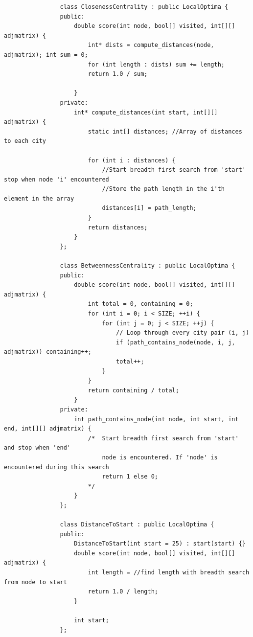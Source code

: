 \documentclass[12pt]{report}
\begin{document}
            \begin{verbatim}
                class ClosenessCentrality : public LocalOptima {
                public:
                    double score(int node, bool[] visited, int[][] adjmatrix) {
                        int* dists = compute_distances(node, adjmatrix); int sum = 0;
                        for (int length : dists) sum += length;
                        return 1.0 / sum;

                    }
                private:
                    int* compute_distances(int start, int[][] adjmatrix) {
                        static int[] distances; //Array of distances to each city

                        for (int i : distances) {
                            //Start breadth first search from 'start' stop when node 'i' encountered
                            //Store the path length in the i'th element in the array
                            distances[i] = path_length;
                        }
                        return distances;
                    }
                };

                class BetweennessCentrality : public LocalOptima {
                public:
                    double score(int node, bool[] visited, int[][] adjmatrix) {
                        int total = 0, containing = 0;
                        for (int i = 0; i < SIZE; ++i) {
                            for (int j = 0; j < SIZE; ++j) {
                                // Loop through every city pair (i, j)
                                if (path_contains_node(node, i, j, adjmatrix)) containing++;
                                total++;
                            }
                        }
                        return containing / total;
                    }
                private:
                    int path_contains_node(int node, int start, int end, int[][] adjmatrix) {
                        /*  Start breadth first search from 'start' and stop when 'end' 
                            node is encountered. If 'node' is encountered during this search
                            return 1 else 0;
                        */
                    }
                };

                class DistanceToStart : public LocalOptima {
                public:
                    DistanceToStart(int start = 25) : start(start) {}
                    double score(int node, bool[] visited, int[][] adjmatrix) {
                        int length = //find length with breadth search from node to start
                        return 1.0 / length;
                    }
                    
                    int start;
                };
            \end{verbatim}
\end{document}
